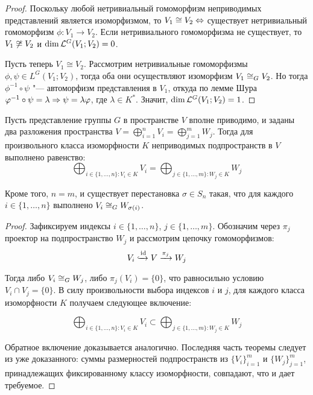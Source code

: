 \begin{proof}
	Поскольку любой нетривиальный гомоморфизм неприводимых представлений является изоморфизмом, то $V_1 \cong V_2 \Leftrightarrow$ существует нетривиальный гомоморфизм $\phi : V_1 \to V_2$. Если нетривиального гомоморфизма не существует, то $V_1\centernot\cong V_2$ и $\dim{\mathcal L^G(V_1; V_2)} = 0$.
	
	Пусть теперь $V_1 \cong V_2$. Рассмотрим нетривиальные гомоморфизмы $\phi, \psi \in L^G(V_1; V_2)$, тогда оба они осуществляют изоморфизм $V_1 \cong_G V_2$. Но тогда $\phi^{-1}\circ\psi$ "--- автоморфизм представления в $V_1$, откуда по лемме Шура $\varphi^{-1}\circ\psi = \lambda \Rightarrow \psi = \lambda \varphi$, где $\lambda \in K^*$. Значит, $\dim{\mathcal L^G(V_1; V_2)} = 1$.
\end{proof}

\begin{theorem}
	Пусть представление группы $G$ в пространстве $V$ вполне приводимо, и заданы два разложения пространства $V = \bigoplus_{i = 1}^nV_i = \bigoplus_{j = 1}^mW_j$. Тогда для произвольного класса изоморфности $K$ неприводимых подпространств в $V$ выполнено равенство:
	\[\bigoplus_{i \in \{1, \dotsc, n\} : V_i \in K}V_i = \bigoplus_{j \in \{1, \dotsc, m\}: W_j \in K}W_j\]
	
	Кроме того, $n = m$, и существует перестановка $\sigma \in S_n$ такая, что для каждого $i \in \{1, \dotsc, n\}$ выполнено $V_i \cong_G W_{\sigma(i)}$.
\end{theorem}

\begin{proof}
	Зафиксируем индексы $i\in \{1, \dotsc, n\}$, $j \in \{1, \dotsc, m\}$. Обозначим через $\pi_j$ проектор на подпространство $W_j$ и рассмотрим цепочку гомоморфизмов:
	\[V_i \xhookrightarrow[]{\mathrm{id}} V \xrightarrow{\pi_j} W_j\]
	
	Тогда либо $V_i \cong_G W_j$, либо $\pi_j(V_i) = \{0\}$, что равносильно условию $V_i \cap V_j = \{0\}$. \pagebreak В силу произвольности выбора индексов $i$ и $j$, для каждого класса изоморфности $K$ получаем  следующее включение:
	
	\[\bigoplus_{i \in \{1, \dotsc, n\} : V_i \in K}V_i \subset \bigoplus_{j \in \{1, \dotsc, m\}: W_j \in K}W_j\]
	
	Обратное включение доказывается аналогично. Последняя часть теоремы следует из уже доказанного: суммы размерностей подпространств из $\{V_i\}_{i = 1}^m$ и $\{W_j\}_{j = 1}^m$, принадлежащих фиксированному классу изоморфности, совпадают, что и дает требуемое.
\end{proof}

